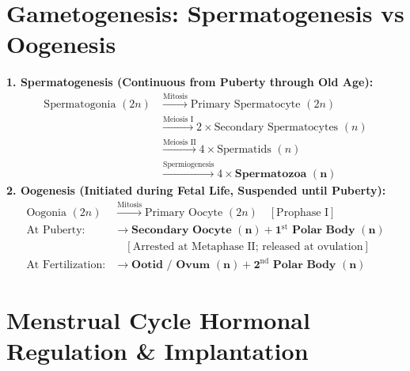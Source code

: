 \documentclass[10pt,twoside,openright]{book}
\begin{document}
\section{Gametogenesis: Spermatogenesis vs Oogenesis}

\begin{formulabox}
\textbf{1. Spermatogenesis (Continuous from Puberty through Old Age):}
\begin{align*}
  \text{Spermatogonia }(2n) &\xrightarrow{\text{Mitosis}} \text{Primary Spermatocyte }(2n) \\
  &\xrightarrow{\text{Meiosis I}} 2 \times \text{Secondary Spermatocytes }(n) \\
  &\xrightarrow{\text{Meiosis II}} 4 \times \text{Spermatids }(n) \\
  &\xrightarrow{\text{Spermiogenesis}} 4 \times \mathbf{\text{Spermatozoa }(n)}
\end{align*}
\textbf{2. Oogenesis (Initiated during Fetal Life, Suspended until Puberty):}
\begin{align*}
  \text{Oogonia }(2n) &\xrightarrow{\text{Mitosis}} \text{Primary Oocyte }(2n) \quad [\text{Prophase I}] \\
  \text{At Puberty:} &\longrightarrow \mathbf{\text{Secondary Oocyte }(n)} + \mathbf{1^{\mathrm{st}}\text{ Polar Body }(n)} \\
  &\quad [\text{Arrested at Metaphase II; released at ovulation}] \\
  \text{At Fertilization:} &\longrightarrow \mathbf{\text{Ootid / Ovum }(n)} + \mathbf{2^{\mathrm{nd}}\text{ Polar Body }(n)}
\end{align*}
\end{formulabox}

\section{Menstrual Cycle Hormonal Regulation \& Implantation}
\end{document}
